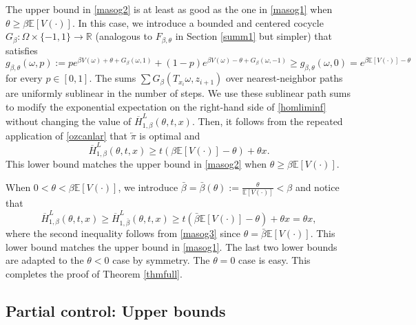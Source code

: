 \documentclass[a4paper]{amsart}
\numberwithin{equation}{section}
\theoremstyle{plain}
\theoremstyle{remark}
\begin{document}
The upper bound in \eqref{masog2} is at least as good as the one in \eqref{masog1} when $\theta\ge\beta\mathbb{E}[V(\cdot)]$. In this case, we introduce a bounded and centered cocycle $G_\beta:\Omega\times\{-1,1\}\to\mathbb{R}$ (analogous to $F_{\beta,\theta}$ in Section \ref{summ1} but simpler) that satisfies
\begin{equation}\label{ozcanlar}
g_{\beta,\theta}(\omega,p) := pe^{\beta V(\omega) + \theta + G_\beta(\omega,1)} + (1-p)e^{\beta V(\omega) - \theta + G_\beta(\omega,-1)}\ge g_{\beta,\theta}(\omega,0) = e^{\beta\mathbb{E}[V(\cdot)] - \theta}
\end{equation}
for every $p\in[0,1]$. The sums $\sum G_{\beta}(T_{x_i}\omega,z_{i+1})$ over nearest-neighbor paths are uniformly sublinear in the number of steps. We use these sublinear path sums to modify the exponential expectation on the right-hand side of \eqref{homliminf} without changing the value of $\overline H_{1,\beta}^L(\theta,t,x)$. Then, it follows from the repeated application of \eqref{ozcanlar} that ${\overleftarrow\pi}$ is optimal and
\begin{equation}\label{masog3}
\overline H_{1,\beta}^L(\theta,t,x) \ge t(\beta\mathbb{E}[V(\cdot)] - \theta) + \theta x.
\end{equation}
This lower bound matches the upper bound in \eqref{masog2}
{}{when $\theta\geq \beta \mathbb{E}[V(\cdot)]$.}

When $0<\theta<\beta\mathbb{E}[V(\cdot)]$, we introduce $\bar\beta = \bar\beta(\theta) := \frac{\theta}{\mathbb{E}[V(\cdot)]} < \beta$ and notice that
\begin{equation}\label{anago}
\overline H_{1,\beta}^L(\theta,t,x) \ge \overline H_{1,\bar\beta}^L(\theta,t,x) \ge t(\bar\beta\mathbb{E}[V(\cdot)] - \theta) + \theta x = \theta x,
\end{equation}
{}{where the second inequality follows from}
 \eqref{masog3} since $\theta = \bar\beta\mathbb{E}[V(\cdot)]$. This lower bound matches the upper bound in \eqref{masog1}. The last two lower bounds are adapted to the $\theta<0$ case by symmetry. The $\theta=0$ case is easy. This completes the proof of Theorem \ref{thmfull}.

\subsection{Partial control: Upper bounds}\label{summ3}
\end{document}
